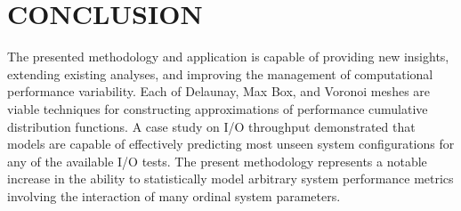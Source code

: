 \documentclass[letterpaper, 10 pt, conference]{ieeeconf}  %
\begin{document}
\section{CONCLUSION}
\label{sec:conclusion}

The presented methodology and application is capable of providing new insights, extending existing analyses, and improving the management of computational performance variability. Each of Delaunay, Max Box, and Voronoi meshes are viable techniques for constructing approximations of performance cumulative distribution functions. A case study on I/O throughput demonstrated that models are capable of effectively predicting most unseen system configurations for any of the available I/O tests. The present methodology represents a notable increase in the ability to statistically model arbitrary system performance metrics involving the interaction of many ordinal system parameters.



\end{document}

